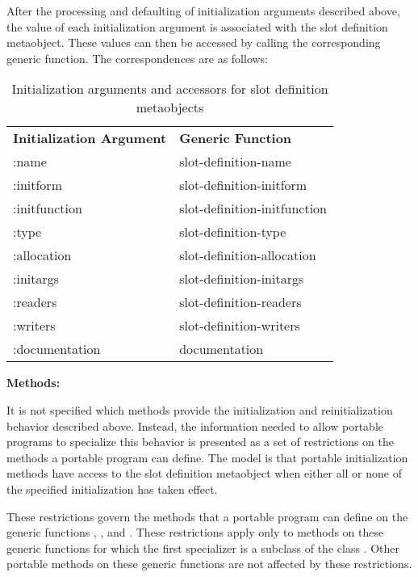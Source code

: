 After the processing and defaulting of initialization arguments described above,
the value of each initialization argument is associated with the slot definition
metaobject. These values can then be accessed by calling the corresponding
generic function. The correspondences are as follows: 

\begin{table}[t]
\caption{Initialization arguments and accessors for slot definition metaobjects}
\label{Initialization-arguments-and-accessors-for-slot-definition-metaobjects}
\begin{flushleft}
\cf
\begin{tabular}{@{}ll@{}}
\textbf{Initialization Argument}&\textbf{Generic Function}\\
:name&slot-definition-name\\
:initform&slot-definition-initform\\
:initfunction&slot-definition-initfunction\\
:type&slot-definition-type\\
:allocation&slot-definition-allocation\\
:initargs&slot-definition-initargs\\
:readers&slot-definition-readers\\
:writers&slot-definition-writers\\
:documentation&documentation
\end{tabular}
\end{flushleft}
\end{table}

\textbf{Methods:}

It is not specified which methods provide the initialization and
reinitialization behavior described above. Instead, the information needed to
allow portable programs to specialize this behavior is presented as a set of
restrictions on the methods a portable program can define. The model is that
portable initialization methods have access to the slot definition metaobject
when either all or none of the specified initialization has taken effect.

These restrictions govern the methods that a portable program can define on the
generic functions , , and
. These restrictions apply only to methods on these
generic functions for which the first specializer is a subclass of the class
. Other portable methods on these generic functions are not
affected by these restrictions.

